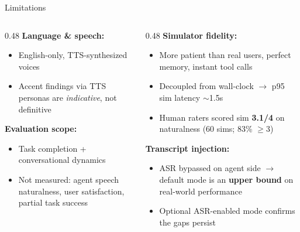 \documentclass[aspectratio=169]{beamer}
\begin{document}

\begin{frame}{Limitations}

  \begin{columns}[T]
    \begin{column}{0.48\textwidth}
      \textbf{Language \& speech:}
      \begin{itemize}
        \item English-only, TTS-synthesized voices
        \item Accent findings via TTS personas are \textit{indicative}, not definitive
      \end{itemize}

      \vspace{0.6em}
      \textbf{Evaluation scope:}
      \begin{itemize}
        \item Task completion + conversational dynamics
        \item Not measured: agent speech naturalness, user satisfaction, partial task success
      \end{itemize}
    \end{column}
    \begin{column}{0.48\textwidth}
      \textbf{Simulator fidelity:}
      \begin{itemize}
        \item More patient than real users, perfect memory, instant tool calls
        \item Decoupled from wall-clock $\rightarrow$ p95 sim latency $\sim$1.5s
        \item Human raters scored sim \textbf{3.1/4} on naturalness (60 sims; 83\% $\ge$3)
      \end{itemize}

      \vspace{0.6em}
      \textbf{Transcript injection:}
      \begin{itemize}
        \item ASR bypassed on agent side $\rightarrow$ default mode is an \textbf{upper bound} on real-world performance
        \item Optional ASR-enabled mode confirms the gaps persist
      \end{itemize}
    \end{column}
  \end{columns}

\end{frame}
\end{document}
